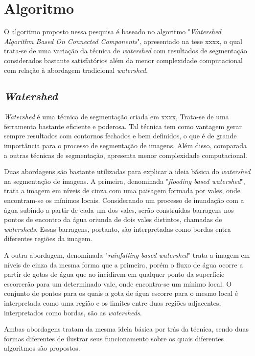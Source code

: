 \chapter{Algoritmo}\label{cap:algoritmo}

O algoritmo proposto nessa pesquisa é baseado no algoritmo "\textit{Watershed Algorithm Based On Connected Components}", apresentado na tese xxxx, o qual trata-se de uma variação da técnica de \textit{watershed} com resultados de segmentação considerados bastante satisfatórios além da menor complexidade computacional com relação à abordagem tradicional \textit{watershed}.

\section{\textit{Watershed}}\label{sec:watershed}
\textit{Watershed} é uma técnica de segmentação criada em xxxx, Trata-se de uma ferramenta bastante eficiente e poderosa. Tal técnica tem como vantagem gerar sempre resultados com contornos fechados e bem definidos, o que é de grande importância para o processo de segmentação de imagens. Além disso, comparada a outras técnicas de segmentação, apresenta menor complexidade computacional.

Duas abordagens são bastante utilizadas para explicar a ideia básica do \textit{watershed} na segmentação de imagens. 
A primeira, denominada "\textit{flooding based watershed}", trata a imagem em níveis de cinza com uma paisagem formada por vales, onde encontram-se os mínimos locais. Considerando um processo de inundação com a água subindo a partir de cada um dos vales, serão construídas barragens nos pontos de encontro da água oriunda de dois vales distintos, chamadas de \textit{watersheds}. Essas barragens, portanto, são interpretadas como bordas entra diferentes regiões da imagem. 



A outra abordagem, denominada "\textit{rainfalling based watershed}" trata a imagem em níveis de cinza da mesma forma que a primeira, porém o fluxo de água ocorre a partir de gotas de água que ao incidirem em qualquer ponto da superfície escorrerão para um determinado vale, onde encontra-se um mínimo local. O conjunto de pontos para os quais a gota de água escorre para o mesmo local é interpretada como uma região e os limites entre duas regiões adjacentes,  interpretados como bordas, são as \textit{watersheds}.



Ambas abordagens tratam da mesma ideia básica por trás da técnica, sendo duas formas diferentes de ilustrar seus funcionamento sobre os quais diferentes algoritmos são propostos.

